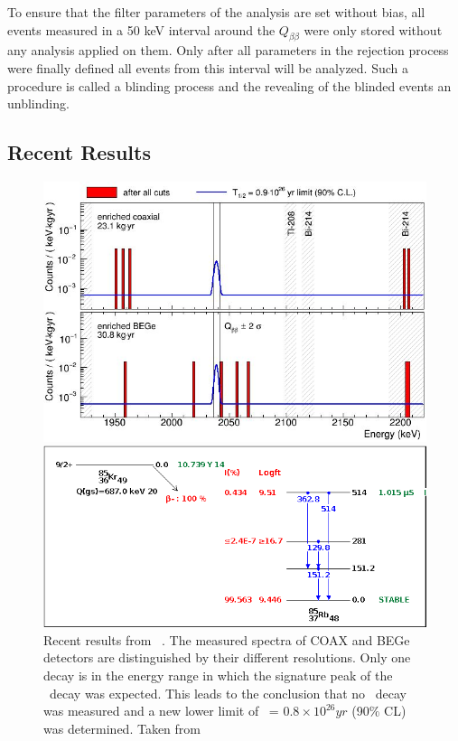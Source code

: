 \documentclass[encoding=utf8,british]{tumphthesis}
\begin{document}
To ensure that the filter parameters of the analysis are set without bias, all events measured in a  50 keV interval around the $Q_{\beta\beta}$ were only stored without any analysis applied on them.
Only after all parameters in the rejection process were finally defined all events from this interval will be analyzed. 
Such a procedure is called a blinding process and the revealing of the blinded events an unblinding. 
\\

\subsection{Recent Results}
\label{sec:Resultsofgerda}
\begin{figure}[t!]
	\centering
	\begin{minipage}{0.475\textwidth}
		\centering
		\includegraphics[width=\textwidth]{./Bilder/GerdaErgebnisse.png}
		\caption{Recent results from \gerda\ \PII. The measured spectra of COAX and BEGe detectors are distinguished by their different resolutions.  Only one decay is in the energy range in which the signature peak of the \onbb\ decay was expected. This leads to the conclusion that no \onbb\ decay was measured and a new lower limit of \thalfzero\ = $0.8\times10^{26}\unit{yr}$ (90$\%$ CL) was determined. Taken from \cite{zsigmond_new_2018}}
		\label{fig:gerdaErgebnisse}
	\end{minipage}\hfill%
	\begin{minipage}{.475\textwidth}
		\centering
	\includegraphics[width=\textwidth]{./Bilder/Kr85Decay.png}
	

\end{minipage}
\end{figure}
\end{document}

